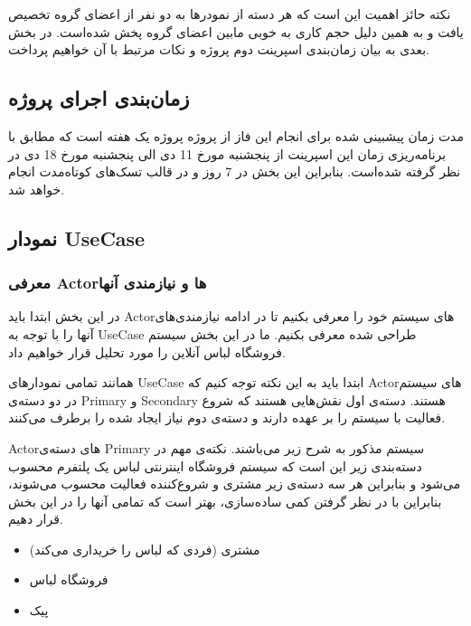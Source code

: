 \documentclass[]{article}
\begin{document}
نکته حائز اهمیت این است که هر دسته از نمودرها به دو نفر از اعضای گروه
تخصیص یافت و به همین دلیل حجم کاری به خوبی مابین اعضای گروه پخش شده‌است.
در بخش بعدی به بیان زمان‌بندی اسپرینت دوم پروژه و نکات مرتبط با آن
خواهیم پرداخت.

\subsection{زمان‌بندی اجرای
پروژه}\label{ux632ux645ux627ux646ux628ux646ux62fux6cc-ux627ux62cux631ux627ux6cc-ux67eux631ux648ux698ux647}

مدت زمان پیشبینی شده برای انجام این فاز از پروژه پروژه یک هفته است که
مطابق با برنامه‌ریزی زمان این اسپرینت از پنجشنبه مورخ 11 دی الی پنجشنبه
مورخ 18 دی در نظر گرفته شده‌است. بنابراین این بخش در 7 روز و در قالب
تسک‌های کوتاه‌مدت انجام خواهد شد.

\subsection{نمودار
UseCase}\label{ux646ux645ux648ux62fux627ux631-usecase}

\subsubsection{معرفی Actorها و نیازمندی
آنها}\label{ux645ux639ux631ux641ux6cc-actorux647ux627-ux648-ux646ux6ccux627ux632ux645ux646ux62fux6cc-ux622ux646ux647ux627}

در این بخش ابتدا باید Actorهای سیستم خود را معرفی بکنیم تا در ادامه
نیازمندی‌های آنها را با توجه به UseCase طراحی شده معرفی بکنیم. ما در این
بخش سیستم فروشگاه لباس آنلاین را مورد تحلیل قرار خواهیم داد.

همانند تمامی نمودارهای UseCase ابتدا باید به این نکته توجه کنیم که
Actorهای سیستم در دو دسته‌ی Primary و Secondary هستند. دسته‌ی اول
نقش‌هایی هستند که شروع فعالیت با سیستم را بر عهده دارند و دسته‌ی دوم
نیاز ایجاد شده را برطرف می‌کنند.

Actorهای دسته‌ی Primary سیستم مذکور به شرح زیر می‌باشند. نکته‌ی مهم در
دسته‌بندی زیر این است که سیستم فروشگاه اینترنتی لباس یک پلتفرم محسوب
می‌شود و بنابراین هر سه دسته‌ی زیر مشتری و شروع‌کننده فعالیت محسوب
می‌شوند، بنابراین با در نظر گرفتن کمی ساده‌سازی، بهتر است که تمامی آنها
را در این بخش قرار دهیم.

\begin{itemize}
\item
  مشتری (فردی که لباس را خریداری می‌کند)
\item
  فروشگاه لباس
\item
  پیک
\end{itemize}
\end{document}
